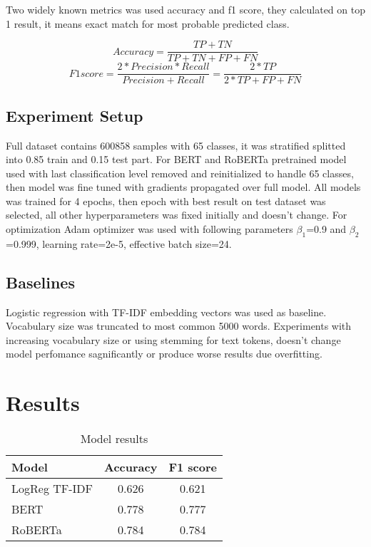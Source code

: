 \documentclass{article}
\begin{document}
Two widely known metrics was used accuracy and f1 score, they calculated on top 1 result, it means exact match for most probable predicted class.

\[
Accuracy = \frac{TP+TN}{TP+TN+FP+FN}
\]
\[
F1 score = \frac{2*Precision*Recall}{Precision+Recall} = \frac{2*TP}{2*TP+FP+FN}
\]

\subsection{Experiment Setup}

Full dataset contains 600858 samples with 65 classes, it was stratified splitted into 0.85 train and 0.15 test part. For BERT and RoBERTa pretrained model used with last classification level removed and reinitialized to handle 65 classes, then model was fine tuned with gradients propagated over full model. All models was trained for 4 epochs, then epoch with best result on test dataset was selected, all other hyperparameters was fixed initially and doesn't change. 
For optimization Adam optimizer was used with following parameters $\beta_{1}$=0.9 and $\beta_{2}$=0.999, learning rate=2e-5, effective batch size=24. 


\subsection{Baselines}

Logistic regression with TF-IDF embedding vectors was used as baseline. Vocabulary size was truncated to most common 5000 words. Experiments with increasing vocabulary size or using stemming for text tokens, doesn't change model perfomance sagnificantly or produce worse results due overfitting.

\section{Results}

\begin{table}[!tbh]
    \centering
    \begin{tabular}{|l|c|c|}
\hline
Model & Accuracy & F1 score \\
\hline
LogReg TF-IDF & 0.626 & 0.621 \\
BERT & 0.778 & 0.777 \\
RoBERTa & 0.784 & 0.784 \\
\hline
    \end{tabular}
    \caption{Model results}
    \label{tab:results}
\end{table}
\end{document}
